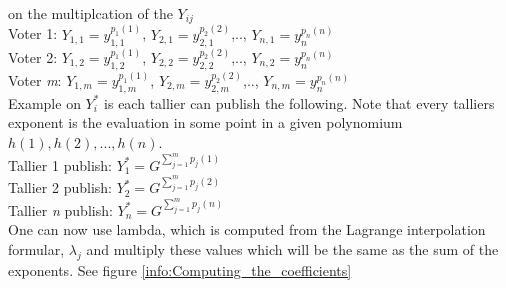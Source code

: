  on the multiplcation of the $Y_{ij}$\\
Voter 1: \begin{math}Y_{1,1}=y_{1,1}^{p_1(1)} \end{math}, \begin{math}Y_{2,1}=y_{2,1}^{p_2(2)} \end{math},.., \begin{math}Y_{n,1}=y_n^{p_n(n)} \end{math}\\
Voter 2: \begin{math}Y_{1,2}=y_{1,2}^{p_1(1)} \end{math}, \begin{math}Y_{2,2}=y_{2,2}^{p_2(2)} \end{math},.., \begin{math}Y_{n,2}=y_n^{p_n(n)} \end{math}\\
Voter \textit{m}: \begin{math}Y_{1,m}=y_{1,m}^{p_1(1)} \end{math}, \begin{math}Y_{2,m}=y_{2,m}^{p_2(2)} \end{math},.., \begin{math}Y_{n,m}=y_n^{p_n(n)} \end{math}\\

\noindent
Example on $Y_i^*$ is each tallier can publish the following. Note that every talliers exponent is the evaluation in some point in a given polynomium \begin{math}h(1), h(2),..., h(n) \end{math}.\\
Tallier 1 publish: \begin{math}Y_1^* = G^{ \sum\limits_{j=1}^m p_j(1)}   \end{math}\\
Tallier 2 publish: \begin{math}Y_2^* = G^{ \sum\limits_{j=1}^m p_j(2)}   \end{math}\\
Tallier \textit{n} publish: \begin{math}Y_n^* = G^{ \sum\limits_{j=1}^m p_j(n)}  \end{math}\\


 One can now use lambda, which is computed from the  Lagrange interpolation formular, \begin{math} \lambda_j \end{math} and multiply these values which will be the same as the sum of the exponents. See figure \ref{info:Computing_the_coefficients} \\

